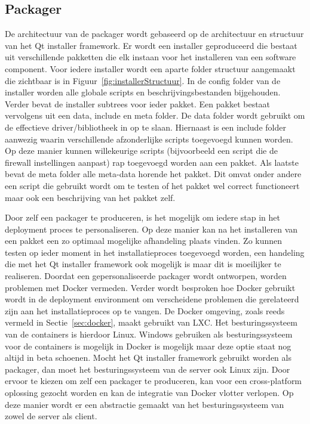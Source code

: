 \subsection{Packager}
De architectuur van de packager wordt gebaseerd op de architectuur en structuur van het Qt installer framework.
Er wordt een installer geproduceerd die bestaat uit verschillende pakketten die elk instaan voor het installeren van een software component.
Voor iedere installer wordt een aparte folder structuur aangemaakt die zichtbaar is in Figuur~\vref{fig:installerStructuur}.
In de config folder van de installer worden alle globale scripts en beschrijvingsbestanden bijgehouden.
Verder bevat de installer subtrees voor ieder pakket.
Een pakket bestaat vervolgens uit een data, include en meta folder.
De data folder wordt gebruikt om de effectieve driver/bibliotheek in op te slaan.
Hiernaast is een include folder aanwezig waarin verschillende afzonderlijke scripts toegevoegd kunnen worden.
Op deze manier kunnen willekeurige scripts (bijvoorbeeld een script die de firewall instellingen aanpast) rap toegevoegd worden aan een pakket.
Als laatste bevat de meta folder alle meta-data horende het pakket.
Dit omvat onder andere een script die gebruikt wordt om te testen of het pakket wel correct functioneert maar ook een beschrijving van het pakket zelf.

Door zelf een packager te produceren, is het mogelijk om iedere stap in het deployment proces te personaliseren.
Op deze manier kan na het installeren van een pakket een zo optimaal mogelijke afhandeling plaats vinden.
Zo kunnen testen op ieder moment in het installatieproces toegevoegd worden, een handeling die met het Qt installer framework ook mogelijk is maar dit is moeilijker te realiseren.
Doordat een gepersonaliseerde packager wordt ontworpen, worden problemen met Docker vermeden.
Verder wordt besproken hoe Docker gebruikt wordt in de deployment environment om verscheidene problemen die gerelateerd zijn aan het installatieproces op te vangen.
De Docker omgeving, zoals reeds vermeld in Sectie~\vref{sec:docker}, maakt gebruikt van LXC.
Het besturingssysteem van de containers is hierdoor Linux.
Windows gebruiken als besturingssysteem voor de containers is mogelijk in Docker is mogelijk maar deze optie staat nog altijd in beta schoenen.
Mocht het Qt installer framework gebruikt worden als packager, dan moet het besturingssysteem van de server ook Linux zijn.
Door ervoor te kiezen om zelf een packager te produceren, kan voor een cross-platform oplossing gezocht worden en kan de integratie van Docker vlotter verlopen.
Op deze manier wordt er een abstractie gemaakt van het besturingssysteem van zowel de server als client.

